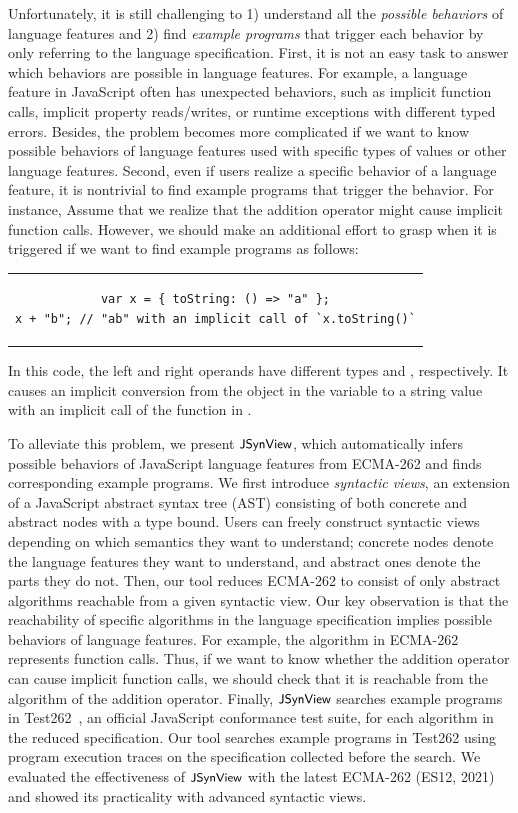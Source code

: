 Unfortunately, it is still challenging to 1) understand all the \textit{possible
behaviors} of language features and 2) find \textit{example programs} that
trigger each behavior by only referring to the language specification.  First,
it is not an easy task to answer which behaviors are possible in language
features.  For example, a language feature in JavaScript often has unexpected
behaviors, such as implicit function calls, implicit property reads/writes, or
runtime exceptions with different typed errors.  Besides, the problem becomes
more complicated if we want to know possible behaviors of language features used
with specific types of values or other language features.  Second, even if users
realize a specific behavior of a language feature, it is nontrivial to find
example programs that trigger the behavior.  For instance, Assume that we
realize that the addition operator might cause implicit function calls.
However, we should make an additional effort to grasp when it is triggered if we
want to find example programs as follows:
\begin{center}
  \begin{tabular}{c}
    \begin{lstlisting}[style=JS]
var x = { toString: () => "a" };
x + "b"; // "ab" with an implicit call of `x.toString()`
    \end{lstlisting}
  \end{tabular}
\end{center}
In this code, the left and right operands have different types  and
, respectively.  It causes an implicit conversion from the object
in the variable  to a string value with an implicit call of the function
in .

To alleviate this problem, we present $\textsf{\small JSynView}$, which automatically infers
possible behaviors of JavaScript language features from ECMA-262 and finds
corresponding example programs.  We first introduce \textit{syntactic views}, an
extension of a JavaScript abstract syntax tree (AST) consisting of both concrete
and abstract nodes with a type bound.  Users can freely construct syntactic
views depending on which semantics they want to understand; concrete nodes
denote the language features they want to understand, and abstract ones denote
the parts they do not.  Then, our tool reduces ECMA-262 to consist of only
abstract algorithms reachable from a given syntactic view.  Our key observation
is that the reachability of specific algorithms in the language specification
implies possible behaviors of language features.  For example, the 
algorithm in ECMA-262 represents function calls.  Thus, if we want to know
whether the addition operator can cause implicit function calls, we should check
that it is reachable from the  algorithm of the addition
operator.  Finally, $\textsf{\small JSynView}$ searches example programs in Test262~\cite{test262},
an official JavaScript conformance test suite, for each algorithm in the reduced
specification.  Our tool searches example programs in Test262 using program
execution traces on the specification collected before the search.  We evaluated
the effectiveness of $\textsf{\small JSynView}$ with the latest ECMA-262 (ES12, 2021) and showed
its practicality with  advanced syntactic views.

